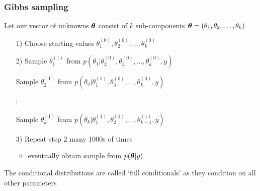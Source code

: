 \begin{frame}

\frametitle{Gibbs sampling}

Let our vector of unknowns $\boldsymbol{\theta}$ consist of $k$ sub-components
$\boldsymbol{\theta} = (\theta_1, \theta_2, \hdots , \theta_k)$ \\ \vspace{2mm}

\begin{itemize}
\item[1)] Choose starting values $\theta_1^{(0)},
\theta_2^{(0)}, \hdots , \theta_k^{(0)}$ \vspace{2mm}
\item[2)] Sample $\theta_1^{(1)}$ from $p(\theta_1 | \theta_2^{(0)}, \theta_3^{(0)},
\hdots , \theta_k^{(0)}, y)$ \vspace{1mm}
\item[] Sample $\theta_2^{(1)}$ from
$p(\theta_2 | \theta_1^{(1)}, \theta_3^{(0)}, \hdots , \theta_k^{(0)}, y)$ \vspace{1mm}
\item[] $\vdots$ \vspace{1mm}
\item[] Sample $\theta_k^{(1)}$ from $p(\theta_k |
\theta_1^{(1)}, \theta_2^{(1)}, \hdots , \theta_{k-1}^{(1)}, y)$\vspace{2mm}
\item[3)] Repeat step 2 many 1000s of times \vspace{1mm}
  \begin{itemize}
  \item eventually obtain sample from $p(\boldsymbol{\theta} | y)$\vspace{2mm}
  \end{itemize}
\end{itemize}

The conditional distributions are called \lq full conditionals' as they condition on all other parameters

\end{frame}

